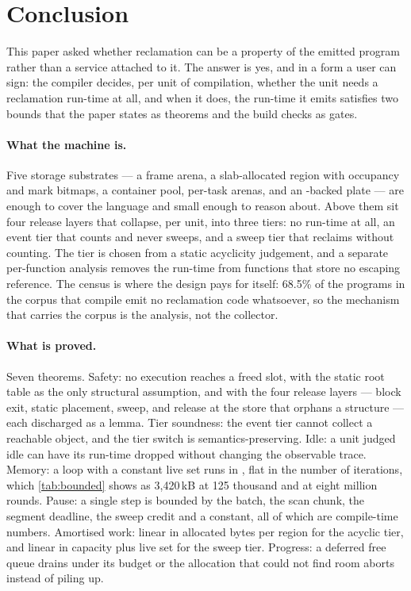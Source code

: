 \section{Conclusion}
\label{sec:conclusion}

This paper asked whether reclamation can be a property of the emitted program rather than a service
attached to it. The answer is yes, and in a form a user can sign: the compiler decides, per unit of
compilation, whether the unit needs a reclamation run-time at all, and when it does, the run-time it
emits satisfies two bounds that the paper states as theorems and the build checks as gates.

\paragraph{What the machine is.}
Five storage substrates --- a frame arena, a slab-allocated region with occupancy and mark bitmaps, a
container pool, per-task arenas, and an -backed plate --- are enough to cover the language
and small enough to reason about.  Above them sit four release layers that collapse, per unit, into
three tiers: no run-time at all, an event tier that counts and never sweeps, and a sweep tier that
reclaims without counting.  The tier is chosen from a static acyclicity judgement, and a separate
per-function analysis removes the run-time from functions that store no escaping reference.  The
census is where the design pays for itself: 68.5\% of the programs in the corpus that compile emit no
reclamation code whatsoever, so the mechanism that carries the corpus is the analysis, not the collector.

\paragraph{What is proved.}
Seven theorems.  Safety: no execution reaches a freed slot, with the static root table as the only
structural assumption, and with the four release layers --- block exit, static placement, sweep, and
release at the store that orphans a structure --- each discharged as a lemma.  Tier soundness: the
event tier cannot collect a reachable object, and the tier switch is semantics-preserving.  Idle: a
unit judged idle can have its run-time dropped without changing the observable trace.  Memory: a
loop with a constant live set runs in , flat in the number of iterations, which
\tab\ref{tab:bounded} shows as 3,420\,kB at 125 thousand and at eight million rounds.  Pause: a
single step is bounded by the batch, the scan chunk, the segment deadline, the sweep credit and a
constant, all of which are compile-time numbers.  Amortised work: linear in allocated bytes per
region for the acyclic tier, and linear in capacity plus live set for the sweep tier.  Progress: a
deferred free queue drains under its budget or the allocation that could not find room aborts instead
of piling up.

